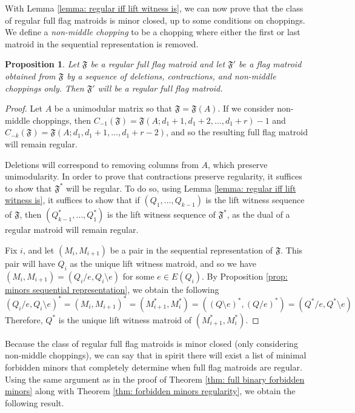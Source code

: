 \documentclass[12pt]{article}
\newtheorem{prop}[thm]{Proposition}
\theoremstyle{definition}
\begin{document}
With Lemma \ref{lemma: regular iff lift witness is}, we can now prove that the class of regular full flag matroids is minor closed, up to some conditions on choppings. We define a \emph{non-middle chopping} to be a chopping where either the first or last matroid in the sequential representation is removed. 

\begin{prop}\label{prop: regular full flag matroids minors}
    Let $\mathfrak{F}$ be a regular full flag matroid and let $\mathfrak{F}'$ be a flag matroid obtained from $\mathfrak{F}$ by a sequence of deletions, contractions, and non-middle choppings only. Then $\mathfrak{F}'$ will be a regular full flag matroid.
\end{prop}
\begin{proof}
    Let $A$ be a unimodular matrix so that $\mathfrak{F} = \mathfrak{F}(A)$. If we consider non-middle choppings, then $C_{-1}(\mathfrak{F}) = \mathfrak{F}(A; d_1+1, d_1+2, \dots, d_1+r)-1$ and $C_{-k}(\mathfrak{F}) = \mathfrak{F}(A; d_1, d_1+1, \dots, d_1+r-2)$, and so the resulting full flag matroid will remain regular. 

    Deletions will correspond to removing columns from $A$, which preserve unimodularity. In order to prove that contractions preserve regularity, it suffices to show that $\mathfrak{F}^*$ will be regular. To do so, using Lemma \ref{lemma: regular iff lift witness is}, it suffices to show that if $(Q_1, \dots, Q_{k-1})$ is the lift witness sequence of $\mathfrak{F}$, then $(Q_{k-1}^*, \dots, Q_1^*)$ is the lift witness sequence of $\mathfrak{F}^*$, as the dual of a regular matroid will remain regular.

    Fix $i$, and let $(M_i, M_{i+1})$ be a pair in the sequential representation of $\mathfrak{F}$. This pair will have $Q_i$ as the unique lift witness matroid, and so we have $(M_i, M_{i+1}) = (Q_i/e, Q_i\setminus e)$ for some $e \in E(Q_i)$. By Proposition \ref{prop: minors sequential representation}, we obtain the following
    \begin{equation*}
        (Q_i/e, Q_i\setminus e)^* = (M_i, M_{i+1})^* = (M_{i+1}^*, M_i^*) = ((Q\setminus e)^*, (Q/e)^*) = (Q^*/e, Q^*\setminus e)
    \end{equation*}
Therefore, $Q^*$ is the unique lift witness matroid of $(M_{i+1}^*, M_i^*)$. 
\end{proof}

Because the class of regular full flag matroids is minor closed (only considering non-middle choppings), we can say that in spirit there will exist a list of minimal forbidden minors that completely determine when full flag matroids are regular. Using the same argument as in the proof of Theorem \ref{thm: full binary forbidden minors} along with Theorem \ref{thm: forbidden minors regularity}, we obtain the following result.
\end{document}
